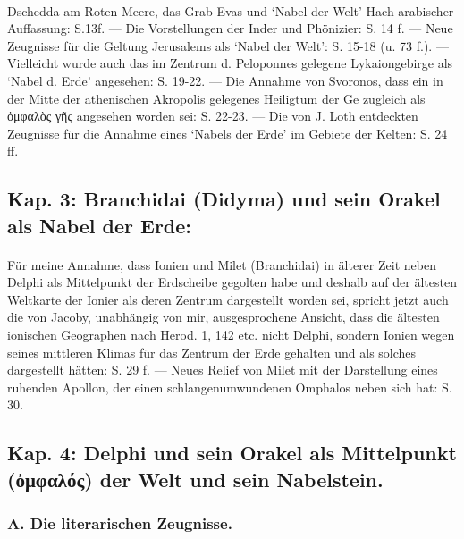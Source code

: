 \documentclass[a4paper, 11pt, oneside]{article}
\begin{document}
\paragraph{}
Dschedda am Roten Meere, das Grab Evas und `Nabel der Welt' Hach arabischer Auffassung: S.13f. --- Die Vorstellungen der Inder und Phönizier: S. 14 f. --- Neue Zeugnisse für die Geltung Jerusalems als `Nabel der Welt': S. 15-18 (u. 73 f.). --- Vielleicht wurde auch das im Zentrum d. Peloponnes gelegene Lykaiongebirge als `Nabel d. Erde' angesehen: S. 19-22. --- Die Annahme von Svoronos, dass ein in der Mitte der athenischen Akropolis gelegenes Heiligtum der Ge zugleich als ὀμφαλὸς γῆς angesehen worden sei: S. 22-23. --- Die von J. Loth entdeckten Zeugnisse für die Annahme eines `Nabels der Erde' im Gebiete der Kelten: S. 24 ff.

\subsection*{Kap. 3: Branchidai (Didyma) und sein Orakel als Nabel der Erde:}
\paragraph{}
Für meine Annahme, dass Ionien und Milet (Branchidai) in älterer Zeit neben Delphi als Mittelpunkt der Erdscheibe gegolten habe und deshalb auf der ältesten Weltkarte der Ionier als deren Zentrum dargestellt worden sei, spricht jetzt auch die von Jacoby, unabhängig von mir, ausgesprochene Ansicht, dass die ältesten ionischen Geographen nach Herod. 1, 142 etc. nicht Delphi, sondern Ionien wegen seines mittleren Klimas für das Zentrum der Erde gehalten und als solches dargestellt hätten: S. 29 f. --- Neues Relief von Milet mit der Darstellung eines ruhenden Apollon, der einen schlangenumwundenen Omphalos neben sich hat: S. 30.

\subsection*{Kap. 4: Delphi und sein Orakel als Mittelpunkt (ὀμφαλός) der Welt und sein Nabelstein.}
\subsubsection*{A. Die literarischen Zeugnisse.}
\end{document}
